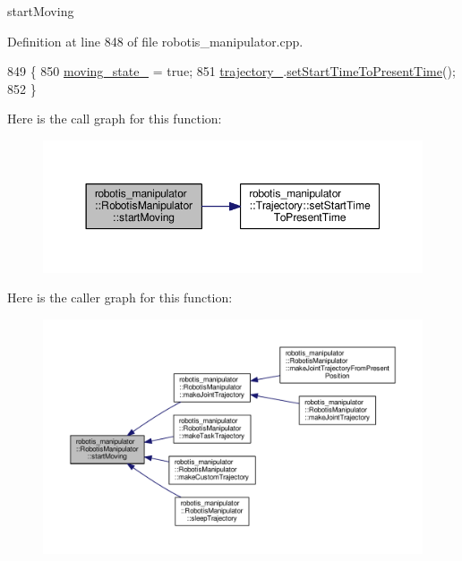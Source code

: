 start\+Moving 



Definition at line 848 of file robotis\+\_\+manipulator.\+cpp.


\begin{DoxyCode}
849 \{
850   \hyperlink{classrobotis__manipulator_1_1_robotis_manipulator_a5b7990548dd779b1ca66a2ad83a74f76}{moving\_state\_} = \textcolor{keyword}{true};
851   \hyperlink{classrobotis__manipulator_1_1_robotis_manipulator_a992d2c7221bcaab8e9a688d12728d738}{trajectory\_}.\hyperlink{classrobotis__manipulator_1_1_trajectory_ad11707f44e3b0cefdb5f60b6c4f3ab77}{setStartTimeToPresentTime}();
852 \}
\end{DoxyCode}


Here is the call graph for this function\+:\nopagebreak
\begin{figure}[H]
\begin{center}
\leavevmode
\includegraphics[width=350pt]{classrobotis__manipulator_1_1_robotis_manipulator_a471cb5d00c34dfe28fd260daaf4fd7a7_cgraph}
\end{center}
\end{figure}




Here is the caller graph for this function\+:\nopagebreak
\begin{figure}[H]
\begin{center}
\leavevmode
\includegraphics[width=350pt]{classrobotis__manipulator_1_1_robotis_manipulator_a471cb5d00c34dfe28fd260daaf4fd7a7_icgraph}
\end{center}
\end{figure}




